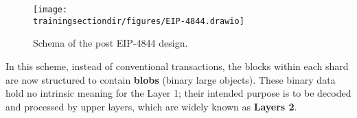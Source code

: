 \begin{enumerate}[(a)]
\begin{figure}[H]
\centering
\texttt{[image: \\trainingsectiondir/figures/EIP-4844.drawio]}
\caption{Schema of the post EIP-4844 design.}
\end{figure}

In this scheme, instead of conventional transactions, the blocks within each shard are now structured to contain \textbf{blobs} (binary large objects). These binary data hold no intrinsic meaning for the Layer 1; their intended purpose is to be decoded and processed by upper layers, which are widely known as \textbf{Layers 2}.


\end{enumerate}
